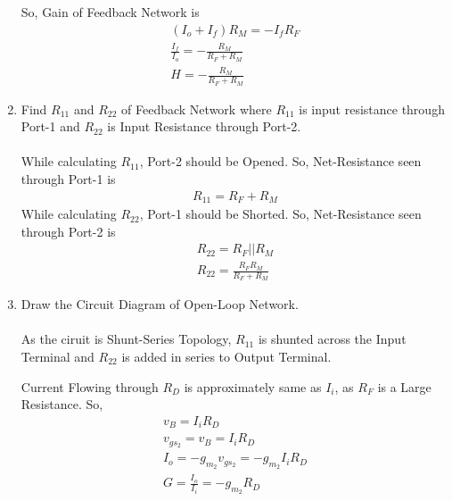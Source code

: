 \begin{enumerate}[label=\thesubsection.\arabic*.,ref=\thesubsection.\theenumi]
So, Gain of Feedback Network is
\begin{align}
(I_{o} + I_{f})R_{M} = -I_{f}R_{F}\\
\frac{I_{f}}{I_{o}} = -\frac{R_{M}}{R_{F}+R_{M}}\\
H = -\frac{R_{M}}{R_{F}+R_{M}}
\end{align}

\item Find $R_{11}$ and $R_{22}$  of Feedback Network where $R_{11}$ is input resistance through Port-1 and $R_{22}$ is Input Resistance through Port-2.\\
\solution\\
While calculating $R_{11}$, Port-2 should be Opened. So, Net-Resistance seen through Port-1 is 
\begin{align}
R_{11} = R_{F} + R_{M}
\end{align}
While calculating $R_{22}$, Port-1 should be Shorted. So, Net-Resistance seen through Port-2 is 
\begin{align}
R_{22} = R_{F} || R_{M}\\
R_{22} = \frac{R_{F}R_{M}}{R_{F}+R_{M}}
\end{align}

\item Draw the Circuit Diagram of Open-Loop Network.\\
\solution\\
As the ciruit is Shunt-Series Topology, $R_{11}$ is shunted across the Input Terminal and $R_{22}$ is added in series to Output Terminal.
\begin{figure}[ht!]
	\begin{center}
		\resizebox{\columnwidth}{!}{}
	\end{center}
	\caption{}
	\label{fig:Control_System}
\end{figure}

Current Flowing through $R_{D}$ is approximately same as $I_{i}$, as $R_{F}$ is a Large Resistance.
So,
\begin{align}
v_{B} = I_{i}R_{D}\\
v_{gs_{2}} = v_{B} = I_{i}R_{D}\\
I_{o} =  -g_{m_{2}}v_{gs_{2}} = -g_{m_{2}}I_{i}R_{D}\\
G = \frac{I_{o}}{I_{i}} =  -g_{m_{2}}R_{D}
\end{align}

\end{enumerate}
